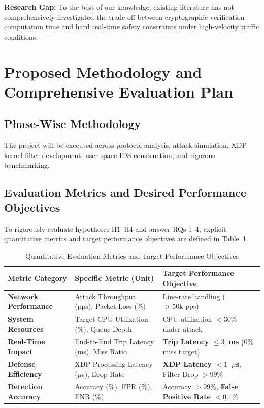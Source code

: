 \documentclass[12pt,a4paper]{article}
\begin{document}
\noindent\textbf{Research Gap:} To the best of our knowledge, existing literature has not comprehensively investigated the trade-off between cryptographic verification computation time and hard real-time safety constraints under high-velocity traffic conditions.

\section{Proposed Methodology and Comprehensive Evaluation Plan}

\subsection{Phase-Wise Methodology}
The project will be executed across protocol analysis, attack simulation, XDP kernel filter development, user-space IDS construction, and rigorous benchmarking.

\subsection{Evaluation Metrics and Desired Performance Objectives}
To rigorously evaluate hypotheses H1--H4 and answer RQs 1--4, explicit quantitative metrics and target performance objectives are defined in Table~\ref{tab:evaluation_metrics}.

\begin{table}[H]
\centering
\caption{Quantitative Evaluation Metrics and Target Performance Objectives}
\label{tab:evaluation_metrics}
\vspace{0.2cm}
\begin{tabularx}{\textwidth}{p{4.2cm} p{4.5cm} X}
\toprule
\textbf{Metric Category} & \textbf{Specific Metric (Unit)} & \textbf{Target Performance Objective} \\
\midrule
\textbf{Network Performance} & Attack Throughput (pps), Packet Loss (\%) & Line-rate handling ($>50\text{k pps}$) \\
\textbf{System Resources} & Target CPU Utilization (\%), Queue Depth & CPU utilization $< 30\%$ under attack \\
\textbf{Real-Time Impact} & End-to-End Trip Latency (ms), Miss Ratio & \textbf{Trip Latency $\le 3$~ms} ($0\%$ miss target) \\
\textbf{Defense Efficiency} & XDP Processing Latency ($\mu$s), Drop Rate & \textbf{XDP Latency $< 1$~$\mu$s}, Filter Drop $>99\%$ \\
\textbf{Detection Accuracy} & Accuracy (\%), FPR (\%), FNR (\%) & Accuracy $>99\%$, \textbf{False Positive Rate $<0.1\%$} \\
\bottomrule
\end{tabularx}
\end{table}
\end{document}
